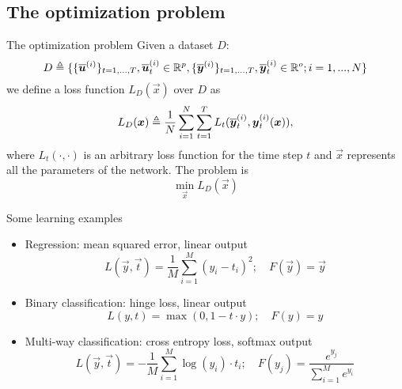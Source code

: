 \subsection{The optimization problem}
\begin{frame}{The optimization problem}
Given a dataset $D$:
\begin{equation}
D\triangleq\{\{\overline{\boldsymbol{u}}^{(i)}\}_{t=1,...,T}, \overline{\boldsymbol{u}}^{(i)}_t \in \mathbb{R}^p, \{\overline{\boldsymbol{y}}^{(i)}\}_{t=1,...,T}, \overline{\boldsymbol{y}}^{(i)}_t \in \mathbb{R}^o;  i=1,...,N\}
\end{equation}
we define a loss function $L_D(\vec{x})$ over $D$  as
\begin{equation}
L_D(\boldsymbol{x})\triangleq\frac{1}{N}\sum_{i=1}^N \sum_{t=1}^T L_t(\overline{\boldsymbol{y}}_t^{(i)},\boldsymbol{y}_t^{(i)}(\boldsymbol{x})),
\end{equation}
where $L_t(\cdot, \cdot)$ is an arbitrary loss function for the time step $t$ and $\vec{x}$ represents all the parameters of the network.
The problem is \begin{equation}
\min_{\vec{x}} L_D(\vec{x})
\end{equation}
\end{frame}

\begin{frame}{Some learning examples}

	\begin{itemize}
		\item Regression: mean squared error, linear output
		\begin{equation}
			L(\vec{y}, \vec{t}) = \frac{1}{M}\sum_{i=1}^M (y_i-t_i)^2; \quad F(\vec{y}) = \vec{y}
		\end{equation}
		\item Binary classification: hinge loss, linear output
		\begin{equation}
			L(y, t) = \max(0,1-t\cdot y ); \quad F(y) = y
		\end{equation}
		\item Multi-way classification: cross entropy loss, softmax output
		\begin{equation}
						L(\vec{y}, \vec{t}) = -\frac{1}{M}\sum_{i=1}^M \log(y_i)\cdot t_i; \quad F(y_j) = \frac{e^{y_j}}{\sum_{i=1}^M e^{y_i}}
		\end{equation}
	\end{itemize}
\end{frame}

